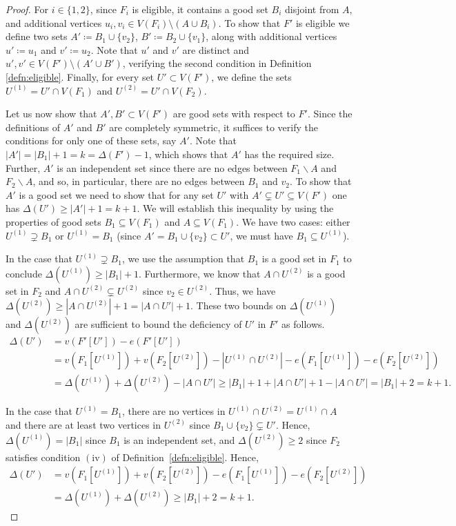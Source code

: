 \begin{proof}
For $i\in \{1,2\}$, since $F_i$ is eligible, it contains a good set $B_i$ disjoint from $A$, and additional vertices $u_i, v_i \in V(F_i) \setminus (A\cup B_i)$. To show that $F'$ is eligible we define two sets $A' \coloneqq B_1\cup \{v_2\}$, $B'\coloneqq B_2\cup \{v_1\}$, along with additional vertices $u' \coloneqq u_1$ and $v' \coloneqq u_2$. Note that $u'$ and $v'$ are distinct and $u', v' \in V(F') \setminus (A' \cup B')$, verifying the second condition in Definition \ref{defn:eligible}. Finally, for every set $U'\subset V(F')$, we define the sets $U^{(1)}=U'\cap V(F_1)$ and $U^{(2)}=U'\cap V(F_2)$.

Let us now show that $A', B'\subset V(F')$ are good sets with respect to $F'$. Since the definitions of $A'$ and $B'$ are completely symmetric, it suffices to verify the conditions for only one of these sets, say $A'$. Note that $|A'|=|B_1|+1=k=\Delta(F')-1$, which shows that $A'$ has the required size. Further, $A'$ is an independent set since there are no edges between $F_1\backslash A$ and $F_2\backslash A$, and so, in particular, there are no edges between $B_1$ and $v_2$. To show that $A'$ is a good set we need to show that for any set $U'$ with $A'\subsetneq U'\subseteq V(F')$ one has $\Delta(U')\geq |A'|+1=k+1$. We will establish this inequality by using the properties of good sets $B_1\subseteq V(F_1)$ and $A\subseteq V(F_1)$. We have two cases: either $U^{(1)}\supsetneq B_1$ or $U^{(1)}=B_1$ (since $A'=B_1\cup \{v_2\}\subset U'$, we must have $B_1\subseteq U^{(1)}$). 

In the case that $U^{(1)}\supsetneq B_1$, we use the assumption that $B_1$ is a good set in $F_1$ to conclude $\Delta(U^{(1)})\geq |B_1|+1$. Furthermore, we know that $A\cap U^{(2)}$ is a good set in $F_2$ and $A\cap U^{(2)}\subsetneq U^{(2)}$ since $v_2\in U^{(2)}$. Thus, we have $\Delta(U^{(2)})\geq |A\cap U^{(2)}|+1 = |A\cap U'|+1$. These two bounds on $\Delta(U^{(1)})$ and $\Delta(U^{(2)})$ are sufficient to bound the deficiency of $U'$ in $F'$ as follows.
\begin{align*}
    \Delta(U')&=v(F'[U'])-e(F'[U']) \\ &=v(F_1[U^{(1)}])+v(F_2[U^{(2)}])-|U^{(1)}\cap U^{(2)}|-e(F_1[U^{(1)}])-e(F_2[U^{(2)}])\\
    &=\Delta(U^{(1)})+\Delta(U^{(2)})-|A\cap U'|\geq|B_1|+1+|A\cap U'|+1-|A\cap U'|=|B_1|+2=k+1.
\end{align*}

In the case that $U^{(1)}=B_1$, there are no vertices in $U^{(1)}\cap U^{(2)}=U^{(1)}\cap A$ and there are at least two vertices in $U^{(2)}$ since $B_1\cup \{v_2\}\subsetneq U'$. Hence, $\Delta(U^{(1)})=|B_1|$ since $B_1$ is an independent set, and $\Delta(U^{(2)})\geq 2$ since $F_2$ satisfies condition $\mathrm{(iv)}$ of Definition~\ref{defn:eligible}. Hence,
\begin{align*} \Delta(U') &=v(F_1[U^{(1)}])+v(F_2[U^{(2)}])-e(F_1[U^{(1)}])-e(F_2[U^{(2)}])\\
&=\Delta(U^{(1)})+\Delta(U^{(2)})\geq |B_1|+2=k+1.
\end{align*}


\end{proof}
